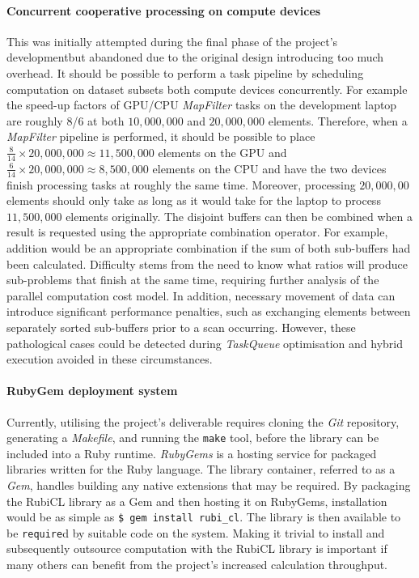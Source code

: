 \paragraph*{Concurrent cooperative processing on compute devices} This was initially attempted during the final phase of the project's developmentbut abandoned due to the original design introducing too much overhead. It should be possible to perform a task pipeline by scheduling computation on dataset subsets both compute devices concurrently. For example the speed-up factors of \ac{GPU}/\ac{CPU} \emph{MapFilter} tasks on the development laptop are roughly $8$/$6$ at both $10,000,000$ and $20,000,000$ elements. Therefore, when a \emph{MapFilter} pipeline is performed, it should be possible to place $\frac{8}{14} \times 20,000,000 \approx 11,500,000$ elements on the \ac{GPU} and $\frac{6}{14} \times 20,000,000 \approx 8,500,000$ elements on the \ac{CPU} and have the two devices finish processing tasks at roughly the same time. Moreover, processing $20,000,00$ elements should only take as long as it would take for the laptop to process $11,500,000$ elements originally. The disjoint buffers can then be combined when a result is requested using the appropriate combination operator. For example, addition would be an appropriate combination if the sum of both sub-buffers had been calculated. Difficulty stems from the need to know what ratios will produce sub-problems that finish at the same time, requiring further analysis of the parallel computation cost model. In addition, necessary movement of data can introduce significant performance penalties, such as exchanging elements between separately sorted sub-buffers prior to a scan occurring. However, these pathological cases could be detected during \emph{TaskQueue} optimisation and hybrid execution avoided in these circumstances.

\paragraph*{RubyGem deployment system}
Currently, utilising the project's deliverable requires cloning the \emph{Git} repository, generating a \emph{Makefile}, and running the \verb|make| tool, before the library can be included into a Ruby runtime.
\emph{RubyGems}\cite{rubygems} is a hosting service for packaged libraries written for the Ruby language. The library container, referred to as a \emph{Gem}, handles building any native extensions that may be required.
By packaging the RubiCL library as a Gem and then hosting it on RubyGems, installation would be as simple as \verb|$ gem install rubi_cl|. The library is then available to be \verb|require|d by suitable code on the system. Making it trivial to install and subsequently outsource computation with the RubiCL library is important if many others can benefit from the project's increased calculation throughput.
